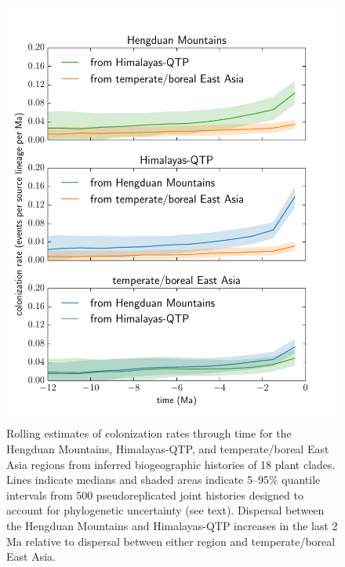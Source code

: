 \documentclass[12pt]{article}
\begin{document}
\begin{figure}
\begin{center}
\includegraphics[width=.99\textwidth]{figures/figure_dispersal_rates/figure_dispersal_rates.pdf}
\end{center}
\caption{Rolling estimates of colonization rates through time for the Hengduan Mountains, Himalayas-QTP, and temperate/boreal East Asia regions from inferred biogeographic histories of 18 plant clades. Lines indicate medians and shaded areas indicate 5–95\% quantile intervals from 500 pseudoreplicated joint histories designed to account for phylogenetic uncertainty (see text). Dispersal between the Hengduan Mountains and Himalayas-QTP increases in the last 2 Ma relative to dispersal between either region and temperate/boreal East Asia.}
\label{fig:dispersal}
\end{figure}
\end{document}
